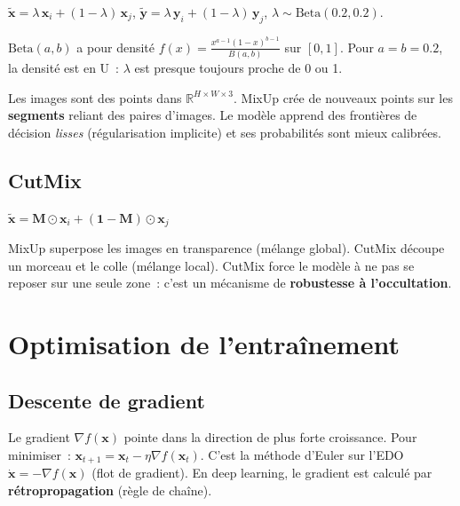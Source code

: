 \documentclass[11pt,a4paper]{article}
\newcommand{\R}{\mathbb{R}}
\begin{document}
$\tilde{\mathbf{x}} = \lambda\,\mathbf{x}_i + (1-\lambda)\,\mathbf{x}_j$, \quad $\tilde{\mathbf{y}} = \lambda\,\mathbf{y}_i + (1-\lambda)\,\mathbf{y}_j$, \quad $\lambda \sim \text{Beta}(0.2, 0.2)$.

\begin{rappelbox}
$\text{Beta}(a,b)$ a pour densit\'e $f(x) = \frac{x^{a-1}(1-x)^{b-1}}{B(a,b)}$ sur $[0,1]$. Pour $a = b = 0.2$, la densit\'e est en U~: $\lambda$ est presque toujours proche de 0 ou 1.
\end{rappelbox}

\begin{intubox}
Les images sont des points dans $\R^{H \times W \times 3}$. MixUp cr\'ee de nouveaux points sur les \textbf{segments} reliant des paires d'images. Le mod\`ele apprend des fronti\`eres de d\'ecision \emph{lisses} (r\'egularisation implicite) et ses probabilit\'es sont mieux calibr\'ees.
\end{intubox}

\subsection{CutMix}

$\tilde{\mathbf{x}} = \mathbf{M} \odot \mathbf{x}_i + (\mathbf{1} - \mathbf{M}) \odot \mathbf{x}_j$

\begin{intubox}
MixUp superpose les images en transparence (m\'elange global). CutMix d\'ecoupe un morceau et le colle (m\'elange local). CutMix force le mod\`ele \`a ne pas se reposer sur une seule zone~: c'est un m\'ecanisme de \textbf{robustesse \`a l'occultation}.
\end{intubox}

\section{Optimisation de l'entra\^inement}

\subsection{Descente de gradient}

\begin{rappelbox}
Le gradient $\nabla f(\mathbf{x})$ pointe dans la direction de plus forte croissance. Pour minimiser~: $\mathbf{x}_{t+1} = \mathbf{x}_t - \eta \nabla f(\mathbf{x}_t)$. C'est la m\'ethode d'Euler sur l'EDO $\dot{\mathbf{x}} = -\nabla f(\mathbf{x})$ (flot de gradient). En deep learning, le gradient est calcul\'e par \textbf{r\'etropropagation} (r\`egle de cha\^ine).
\end{rappelbox}
\end{document}
